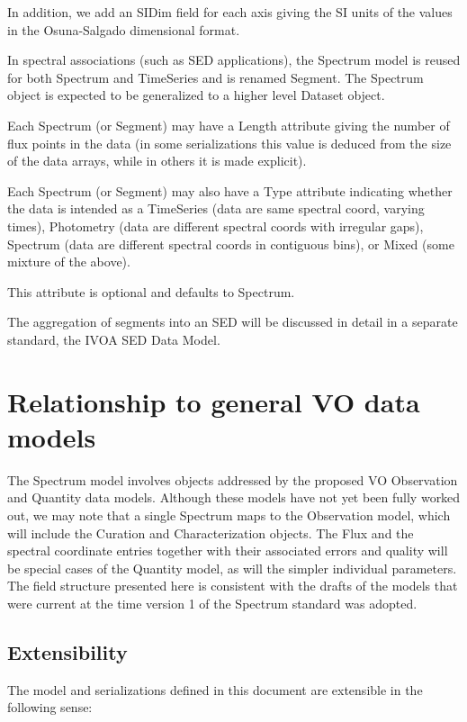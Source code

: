 \documentclass[11pt]{article}
\newcommand{\new}{\color{red}}
\begin{document}
In addition,
we add an SIDim field for each axis giving the SI units of the
values in the Osuna-Salgado dimensional format.

In spectral associations (such as SED applications), 
the Spectrum model is reused for both Spectrum and
TimeSeries and is renamed Segment. The Spectrum object is expected to be
generalized to a higher level Dataset object.

Each Spectrum (or Segment) may have a Length attribute giving the
number of flux points in the data (in some serializations
this value is deduced from the size of the data arrays, while in
others it is made explicit).

Each Spectrum (or Segment) may also have a Type attribute indicating
whether the data is intended as a TimeSeries (data are same spectral
coord, varying times), Photometry (data are different spectral coords
with irregular gaps), Spectrum (data are different spectral coords in
contiguous bins), or Mixed (some mixture of the above). 
 
This attribute is optional and defaults to Spectrum.

{\new The aggregation of segments into an SED will be discussed in detail in
a separate standard, the IVOA SED Data Model.}


\clearpage


\section{Relationship to general VO data models}

The Spectrum model involves objects addressed by the proposed VO
Observation and Quantity data models. Although these models have not yet
been fully worked out, we may note that a single Spectrum maps to the
Observation model, which will include the Curation and Characterization objects.
The Flux and the spectral coordinate entries together with their
associated errors and quality will be special cases of the Quantity
model, as will the simpler individual parameters. The field structure
presented here is consistent with {\new the drafts of the models that were current
at the time version 1 of the Spectrum standard was adopted.}


\subsection{Extensibility}

The model and serializations defined in this document are
extensible in the following sense:
\end{document}
